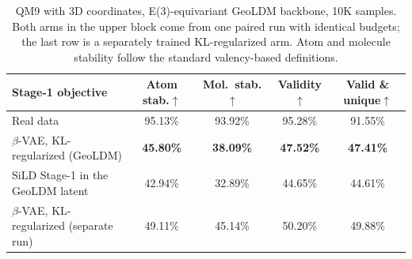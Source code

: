 \begin{table}[h]
\centering
\caption{%
QM9 with 3D coordinates, E(3)-equivariant GeoLDM backbone, 10K samples.
Both arms in the upper block come from one paired run with identical
budgets; the last row is a separately trained KL-regularized arm. Atom and
molecule stability follow the standard valency-based definitions.%
}
\label{tab:qm9_3d}
\small
\begin{tabular}{lcccc}
\toprule
Stage-1 objective & Atom stab.$\uparrow$ & Mol.\ stab.$\uparrow$ & Validity$\uparrow$ & Valid \& unique$\uparrow$ \\
\midrule
Real data                                & 95.13\% & 93.92\% & 95.28\% & 91.55\% \\
\midrule
$\beta$-VAE, KL-regularized (GeoLDM)     & \textbf{45.80\%} & \textbf{38.09\%} & \textbf{47.52\%} & \textbf{47.41\%} \\
SiLD Stage-1 in the GeoLDM latent        & 42.94\% & 32.89\% & 44.65\% & 44.61\% \\
\midrule
$\beta$-VAE, KL-regularized (separate run) & 49.11\% & 45.14\% & 50.20\% & 49.88\% \\
\bottomrule
\end{tabular}
\end{table}
